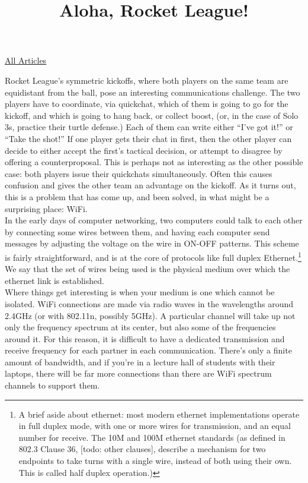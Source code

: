 \documentclass{article}
\title{Aloha, Rocket League!}
\begin{document}
\maketitle
\begin{center}
  \href{../index.html}{All Articles}
\end{center}

Rocket League’s symmetric kickoffs, where both players on the same team are equidistant from the ball, pose an interesting communications challenge. The two players have to coordinate, via quickchat, which of them is going to go for the kickoff, and which is going to hang back, or collect boost, (or, in the case of Solo 3s, practice their turtle defense.) Each of them can write either “I’ve got it!” or “Take the shot!” If one player gets their chat in first, then the other player can decide to either accept the first’s tactical decision, or attempt to disagree by offering a counterproposal. This is perhaps not as interesting as the other possible case: both players issue their quickchats simultaneously. Often this causes confusion and gives the other team an advantage on the kickoff. As it turns out, this is a problem that has come up, and been solved, in what might be a surprising place: WiFi.\\

In the early days of computer networking, two computers could talk to each other by connecting some wires between them, and having each computer send messages by adjusting the voltage on the wire in ON-OFF patterns. This scheme is fairly straightforward, and is at the core of protocols like full duplex Ethernet.\footnote{A brief aside about ethernet: most modern ethernet implementations operate in full duplex mode, with one or more wires for transmission, and an equal number for receive. The 10M and 100M ethernet standards (as defined in 802.3 Clause 36, [todo: other clauses], describe a mechanism for two endpoints to take turns with a single wire, instead of both using their own. This is called half duplex operation.)} We say that the set of wires being used is the physical medium over which the ethernet link is established.\\

Where things get interesting is when your medium is one which cannot be isolated. WiFi connections are made via radio waves in the wavelengths around 2.4GHz (or with 802.11n, possibly 5GHz). A particular channel will take up not only the frequency spectrum at its center, but also some of the frequencies around it. For this reason, it is difficult to have a dedicated transmission and receive frequency for each partner in each communication. There’s only a finite amount of bandwidth, and if you’re in a lecture hall of students with their laptops, there will be far more connections than there are WiFi spectrum channels to support them.\\
\end{document}
